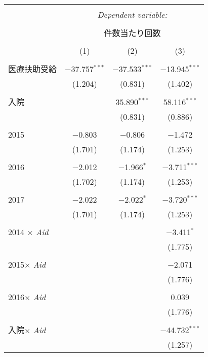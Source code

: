 \documentclass{jsarticle}
\begin{document}
\begin{table}[!htbp] \centering 
  \caption{} 
  \label{} 
  \small
\begin{tabular}{@{\extracolsep{5pt}}lccc} 
\\[-1.8ex]\hline 
\hline \\[-1.8ex] 
 & \multicolumn{3}{c}{\textit{Dependent variable:}} \\ 
\cline{2-4} 
\\[-1.8ex] & \multicolumn{3}{c}{件数当たり回数} \\ 
\\[-1.8ex] & (1) & (2) & (3)\\ 
\hline \\[-1.8ex]
  医療扶助受給 & $-$37.757$^{***}$ & $-$37.533$^{***}$ & $-$13.945$^{***}$ \\ 
  & (1.204) & (0.831) & (1.402) \\ 
  & & & \\ 
 入院 &  & 35.890$^{***}$ & 58.116$^{***}$ \\ 
  &  & (0.831) & (0.886) \\ 
  & & & \\ 
 2015 & $-$0.803 & $-$0.806 & $-$1.472 \\ 
  & (1.701) & (1.174) & (1.253) \\ 
  & & & \\ 
 2016 & $-$2.012 & $-$1.966$^{*}$ & $-$3.711$^{***}$ \\ 
  & (1.702) & (1.174) & (1.253) \\ 
  & & & \\ 
 2017 & $-$2.022 & $-$2.022$^{*}$ & $-$3.720$^{***}$ \\ 
  & (1.701) & (1.174) & (1.253) \\ 
  & & & \\ 
 2014 $\times$ \textit{Aid} &  &  & $-$3.411$^{*}$ \\ 
  &  &  & (1.775) \\ 
  & & & \\ 
 2015$\times$ \textit{Aid} &  &  & $-$2.071 \\ 
  &  &  & (1.776) \\ 
  & & & \\ 
 2016$\times$ \textit{Aid} &  &  & 0.039 \\ 
  &  &  & (1.776) \\ 
  & & & \\ 
 入院$\times$ \textit{Aid} &  &  & $-$44.732$^{***}$ \\ 
  &  &  & (1.257) \\ 

\end{tabular}
\end{table}
\end{document}
